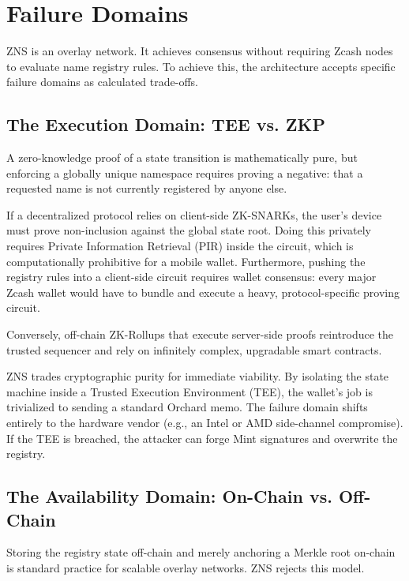 \section{Failure Domains}
\label{sec:failure-domains}

ZNS is an overlay network. It achieves consensus without requiring Zcash nodes to evaluate name registry rules. To achieve this, the architecture accepts specific failure domains as calculated trade-offs.

\subsection{The Execution Domain: TEE vs. ZKP}

A zero-knowledge proof of a state transition is mathematically pure, but enforcing a globally unique namespace requires proving a negative: that a requested name is not currently registered by anyone else.

If a decentralized protocol relies on client-side ZK-SNARKs, the user's device must prove non-inclusion against the global state root. Doing this privately requires Private Information Retrieval (PIR) inside the circuit, which is computationally prohibitive for a mobile wallet. Furthermore, pushing the registry rules into a client-side circuit requires wallet consensus: every major Zcash wallet would have to bundle and execute a heavy, protocol-specific proving circuit.

Conversely, off-chain ZK-Rollups that execute server-side proofs reintroduce the trusted sequencer and rely on infinitely complex, upgradable smart contracts.

ZNS trades cryptographic purity for immediate viability. By isolating the state machine inside a Trusted Execution Environment (TEE), the wallet's job is trivialized to sending a standard Orchard memo. The failure domain shifts entirely to the hardware vendor (e.g., an Intel or AMD side-channel compromise). If the TEE is breached, the attacker can forge Mint signatures and overwrite the registry.

\subsection{The Availability Domain: On-Chain vs. Off-Chain}

Storing the registry state off-chain and merely anchoring a Merkle root on-chain is standard practice for scalable overlay networks. ZNS rejects this model. 

